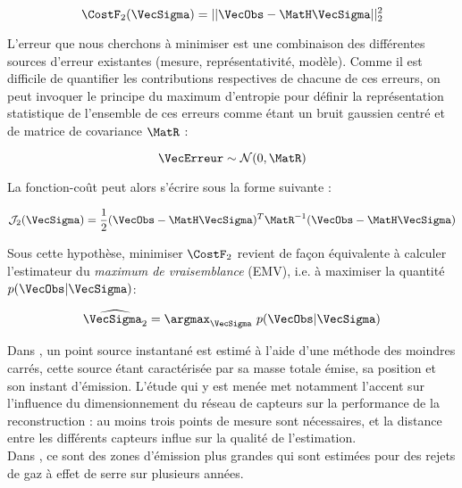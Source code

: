 \begin{equation}
\CostF_{2}(\VecSigma) = ||\VecObs - \MatH \VecSigma ||_2^2
\label{eq_cost_MCO}
\end{equation}

L'erreur que nous cherchons à minimiser est une combinaison des différentes sources d'erreur existantes (mesure, représentativité, modèle). Comme il est difficile de quantifier les contributions respectives de chacune de ces erreurs, on peut invoquer le principe du maximum d'entropie pour définir la représentation statistique de l'ensemble de ces erreurs comme étant un bruit gaussien centré et de matrice de covariance $\MatR$ : 

\begin{equation}
\VecErreur \sim \mathcal{N}(0,\MatR)
\label{eq_bruit_obs}
\end{equation}

La fonction-coût peut alors s'écrire sous la forme suivante \cite{Winiarek2011}:

\begin{equation}
\mathcal{J}_2(\VecSigma) = \dfrac{1}{2}(\VecObs - \MatH \VecSigma)^T \MatR^{-1}(\VecObs - \MatH\VecSigma)
\label{eq_cost_forme2}
\end{equation}

Sous cette hypothèse, minimiser $\CostF_2$ revient de façon équivalente à calculer l'estimateur du \textit{maximum de vraisemblance} (EMV), i.e. à maximiser la quantité $p(\VecObs | \VecSigma)$: 

\begin{equation}
\widehat{\VecSigma_2} = \argmax_\VecSigma~ p(\VecObs | \VecSigma)
\label{eq_ML_MCO}
\end{equation}

Dans \cite{Kathirgamanathan2002}, un point source instantané est estimé à l'aide d'une méthode des moindres carrés, cette source étant caractérisée par sa masse totale émise, sa position et son instant d'émission. L'étude qui y est menée met notamment l'accent sur l'influence du dimensionnement du réseau de capteurs sur la performance de la reconstruction : au moins trois points de mesure sont nécessaires, et la distance entre les différents capteurs influe sur la qualité de l'estimation.\\

Dans \cite{Ryall2001}, ce sont des zones d'émission plus grandes qui sont estimées pour des rejets de gaz à effet de serre sur plusieurs années. \\

